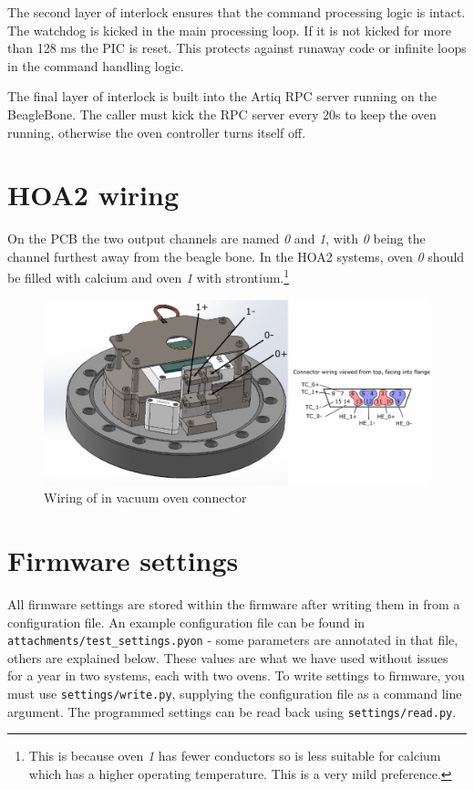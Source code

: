 \documentclass{article}
\newcommand{\refsettings}{\texttt{attachments/test\_settings.pyon}}
\begin{document}
The second layer of interlock ensures that the command processing logic is
intact. The watchdog is kicked in the main processing loop. If it is not kicked
for more than 128 ms the PIC is reset. This protects against runaway code or
infinite loops in the command handling logic.

The final layer of interlock is built into the Artiq RPC server running on the
BeagleBone. The caller must kick the RPC server every 20s to keep the oven running,
otherwise the oven controller turns itself off.


\section{HOA2 wiring}
On the PCB the two output channels are named \textit{0} and \textit{1}, with \textit{0} being the channel furthest away from the beagle bone. In the HOA2 systems, oven \textit{0} should be filled with calcium and oven \textit{1} with strontium.\footnote{This is because oven \textit{1} has fewer conductors so is less suitable for calcium which has a higher operating temperature. This is a very mild preference.}

\begin{figure}[H]
    \center
    \includegraphics[scale=1]{figures/baseflange_wiring.pdf}
    \caption{Wiring of in vacuum oven connector}
    \label{fig:baseflange_wiring}
\end{figure}

\section{Firmware settings}
All firmware settings are stored within the firmware after writing them in from a configuration file.
An example configuration file can be found in \refsettings{} - some parameters are annotated in that file, others are explained below.
These values are what we have used without issues for a year in two systems, each with two ovens.
To write settings to firmware, you must use \texttt{settings/write.py}, supplying the configuration file as a command line argument.
The programmed settings can be read back using \texttt{settings/read.py}.
\end{document}
